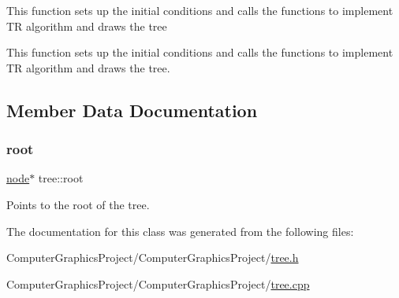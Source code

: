 This function sets up the initial conditions and calls the functions to implement \textquotesingle{}TR\textquotesingle{} algorithm and draws the tree

This function sets up the initial conditions and calls the functions to implement \textquotesingle{}TR\textquotesingle{} algorithm and draws the tree. 

\subsection{Member Data Documentation}
\mbox{\label{classtree_ad397d4906e47149b98f769b3e81473ee}} 
\subsubsection{\texorpdfstring{root}{root}}
{\footnotesize\ttfamily \hyperlink{structnode}{node}$\ast$ tree\+::root\hspace{0.3cm}{\ttfamily [private]}}

Points to the root of the tree. 

The documentation for this class was generated from the following files\+:\begin{DoxyCompactItemize}
\item 
Computer\+Graphics\+Project/\+Computer\+Graphics\+Project/\hyperlink{tree_8h}{tree.\+h}\item 
Computer\+Graphics\+Project/\+Computer\+Graphics\+Project/\hyperlink{tree_8cpp}{tree.\+cpp}\end{DoxyCompactItemize}
